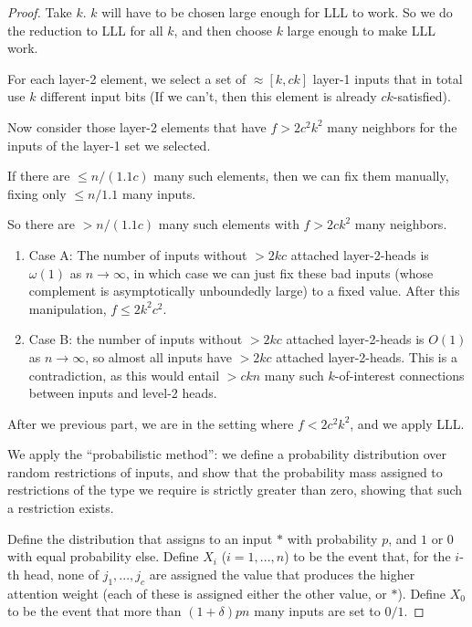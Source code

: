 \documentclass[11pt,a4paper]{article}
\begin{document}
\begin{proof}

Take $k$. $k$ will have to be chosen large enough for LLL to work. So we do the reduction to LLL for all $k$, and then choose $k$ large enough to make LLL work.

For each layer-2 element, we select a set of $\approx [k, ck]$ layer-1 inputs that in total use $k$ different input bits (If we can't, then this element is already $ck$-satisfied).

Now consider those layer-2 elements that have $f > 2c^2k^2$ many neighbors for the inputs of the layer-1 set we selected.

If there are $\leq n/(1.1c)$ many such elements, then we can fix them manually, fixing only $\leq n/1.1$ many inputs.


So there are $> n/(1.1c)$ many such elements with $f > 2ck^2$ many neighbors.

\begin{enumerate}
\item Case A: The number of inputs without $> 2kc$ attached layer-2-heads is $\omega(1)$ as $n\rightarrow \infty$, in which case we can just fix these bad inputs (whose complement is asymptotically unboundedly large) to a fixed value. After this manipulation, $f \leq 2k^2c^2$.

\item Case B: the number of inputs without $> 2kc$ attached layer-2-heads is $O(1)$ as $n\rightarrow\infty$, so almost all inputs have $> 2kc$ attached layer-2-heads. This is a contradiction, as this would entail $>ckn$ many such $k$-of-interest  connections between inputs and level-2 heads.
\end{enumerate}

After we previous part, we are in the setting where $f < 2c^2k^2$, and we apply LLL.


We apply the ``probabilistic method'': we define a probability distribution over random restrictions of inputs, and show that the probability mass assigned to restrictions of the type we require is strictly greater than zero, showing that such a restriction exists.

Define the distribution that assigns to an input $*$ with probability $p$, and $1$ or $0$ with equal probability else.
Define $X_i$ ($i=1, ..., n$) to be the event that, for the $i$-th head, none of $j_1, ..., j_c$ are assigned the value that produces the higher attention weight (each of these is assigned either the other value, or $*$).
Define $X_0$ to be the event that more than $(1+\delta)pn$ many inputs are set to $0/1$.


\end{proof}
\end{document}
